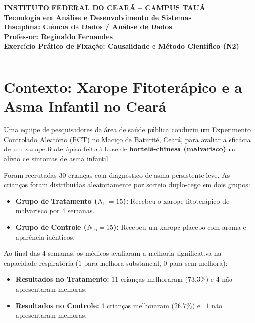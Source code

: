 \documentclass[12pt]{article}
\begin{document}
\begin{center}
    \vspace{0.5cm}
    \textbf{INSTITUTO FEDERAL DO CEARÁ -- CAMPUS TAUÁ} \\
    \textbf{Tecnologia em Análise e Desenvolvimento de Sistemas} \\
    \textbf{Disciplina: Ciência de Dados / Análise de Dados} \\
    \textbf{Professor: Reginaldo Fernandes} \\
    \vspace{0.5cm}
    \large{\textbf{Exercício Prático de Fixação: Causalidade e Método Científico (N2)}}
    \vspace{0.3cm}
\end{center}

\hrule
\vspace{0.4cm}

\section*{Contexto: Xarope Fitoterápico e a Asma Infantil no Ceará}
Uma equipe de pesquisadores da área de saúde pública conduziu um Experimento Controlado Aleatório (RCT) no Maciço de Baturité, Ceará, para avaliar a eficácia de um xarope fitoterápico feito à base de \textbf{hortelã-chinesa (malvarisco)} no alívio de sintomas de asma infantil.

Foram recrutadas $30$ crianças com diagnóstico de asma persistente leve. As crianças foram distribuídas aleatoriamente por sorteio duplo-cego em dois grupos:
\begin{itemize}
    \item \textbf{Grupo de Tratamento ($N_{\text{tr}} = 15$):} Recebeu o xarope fitoterápico de malvarisco por 4 semanas.
    \item \textbf{Grupo de Controle ($N_{\text{co}} = 15$):} Recebeu um xarope placebo com aroma e aparência idênticos.
\end{itemize}

Ao final das 4 semanas, os médicos avaliaram a melhoria significativa na capacidade respiratória ($1$ para melhora substancial, $0$ para sem melhora):
\begin{itemize}
    \item \textbf{Resultados no Tratamento:} $11$ crianças melhoraram ($73.3\%$) e $4$ não apresentaram melhoras.
    \item \textbf{Resultados no Controle:} $4$ crianças melhoraram ($26.7\%$) e $11$ não apresentaram melhoras.
\end{itemize}
\end{document}
